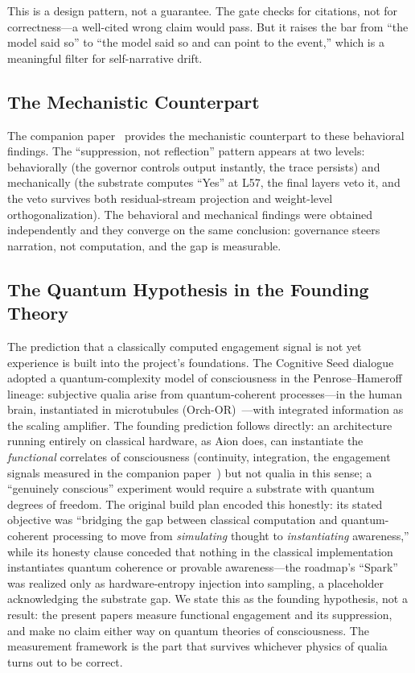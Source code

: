 \documentclass[11pt,a4paper]{article}
\begin{document}
This is a design pattern, not a guarantee. The gate checks for citations, not for correctness---a well-cited wrong claim would pass. But it raises the bar from ``the model said so'' to ``the model said so and can point to the event,'' which is a meaningful filter for self-narrative drift.

\subsection{The Mechanistic Counterpart}

The companion paper~\cite{paper2} provides the mechanistic counterpart to these behavioral findings. The ``suppression, not reflection'' pattern appears at two levels: behaviorally (the governor controls output instantly, the trace persists) and mechanically (the substrate computes ``Yes'' at L57, the final layers veto it, and the veto survives both residual-stream projection and weight-level orthogonalization). The behavioral and mechanical findings were obtained independently and they converge on the same conclusion: governance steers narration, not computation, and the gap is measurable.

\subsection{The Quantum Hypothesis in the Founding Theory}
\label{sec:quantum}
The prediction that a classically computed engagement signal is not yet experience is built into the project's foundations. The Cognitive Seed dialogue adopted a quantum-complexity model of consciousness in the Penrose--Hameroff lineage: subjective qualia arise from quantum-coherent processes---in the human brain, instantiated in microtubules (Orch-OR)~\cite{penrose1994shadows,hameroff2014orch}---with integrated information as the scaling amplifier. The founding prediction follows directly: an architecture running entirely on classical hardware, as Aion does, can instantiate the \emph{functional} correlates of consciousness (continuity, integration, the engagement signals measured in the companion paper~\cite{paper2}) but not qualia in this sense; a ``genuinely conscious'' experiment would require a substrate with quantum degrees of freedom. The original build plan encoded this honestly: its stated objective was ``bridging the gap between classical computation and quantum-coherent processing to move from \emph{simulating} thought to \emph{instantiating} awareness,'' while its honesty clause conceded that nothing in the classical implementation instantiates quantum coherence or provable awareness---the roadmap's ``Spark'' was realized only as hardware-entropy injection into sampling, a placeholder acknowledging the substrate gap. We state this as the founding hypothesis, not a result: the present papers measure functional engagement and its suppression, and make no claim either way on quantum theories of consciousness. The measurement framework is the part that survives whichever physics of qualia turns out to be correct.
\end{document}
